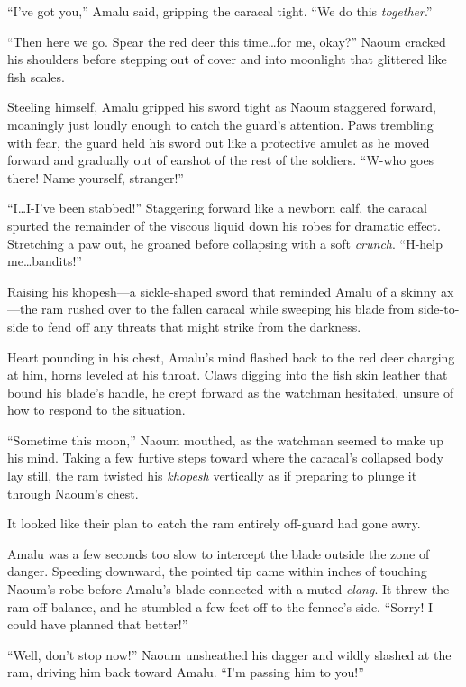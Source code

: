 ``I've got you,'' Amalu said, gripping the caracal tight. ``We do this \emph{together}.''

``Then here we go. Spear the red deer this time\ldots for me, okay?'' Naoum cracked his shoulders before stepping out of cover and into moonlight that glittered like fish scales.

Steeling himself, Amalu gripped his sword tight as Naoum staggered forward, moaningly just loudly enough to catch the guard's attention. Paws trembling with fear, the guard held his sword out like a protective amulet as he moved forward and gradually out of earshot of the rest of the soldiers. ``W-who goes there! Name yourself, stranger!''

``I\ldots I-I've been stabbed!'' Staggering forward like a newborn calf, the caracal spurted the remainder of the viscous liquid down his robes for dramatic effect. Stretching a paw out, he groaned before collapsing with a soft \emph{crunch}. ``H-help me\ldots bandits!''

Raising his khopesh---a sickle-shaped sword that reminded Amalu of a skinny ax---the ram rushed over to the fallen caracal while sweeping his blade from side-to-side to fend off any threats that might strike from the darkness.

Heart pounding in his chest, Amalu's mind flashed back to the red deer charging at him, horns leveled at his throat. Claws digging into the fish skin leather that bound his blade's handle, he crept forward as the watchman hesitated, unsure of how to respond to the situation.

``Sometime this moon,'' Naoum mouthed, as the watchman seemed to make up his mind. Taking a few furtive steps toward where the caracal's collapsed body lay still, the ram twisted his \emph{khopesh} vertically as if preparing to plunge it through Naoum's chest.

It looked like their plan to catch the ram entirely off-guard had gone awry.

Amalu was a few seconds too slow to intercept the blade outside the zone of danger. Speeding downward, the pointed tip came within inches of touching Naoum's robe before Amalu's blade connected with a muted \emph{clang}. It threw the ram off-balance, and he stumbled a few feet off to the fennec's side. ``Sorry! I could have planned that better!''

``Well, don't stop now!'' Naoum unsheathed his dagger and wildly slashed at the ram, driving him back toward Amalu. ``I'm passing him to you!''

